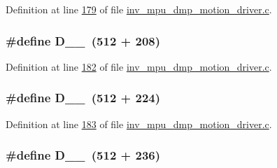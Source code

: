 Definition at line \hyperlink{inv__mpu__dmp__motion__driver_8c_source_l00179}{179} of file \hyperlink{inv__mpu__dmp__motion__driver_8c_source}{inv\+\_\+mpu\+\_\+dmp\+\_\+motion\+\_\+driver.\+c}.

\subsubsection[{\texorpdfstring{D\+\_\+2\+\_\+208}{D_2_208}}]{\setlength{\rightskip}{0pt plus 5cm}\#define D\+\_\+\_~(512 + 208)}\hypertarget{group___d_r_i_v_e_r_s_gae2175af550784283fee34f3e67ba9c35}{}\label{group___d_r_i_v_e_r_s_gae2175af550784283fee34f3e67ba9c35}


Definition at line \hyperlink{inv__mpu__dmp__motion__driver_8c_source_l00182}{182} of file \hyperlink{inv__mpu__dmp__motion__driver_8c_source}{inv\+\_\+mpu\+\_\+dmp\+\_\+motion\+\_\+driver.\+c}.

\subsubsection[{\texorpdfstring{D\+\_\+2\+\_\+224}{D_2_224}}]{\setlength{\rightskip}{0pt plus 5cm}\#define D\+\_\+\_~(512 + 224)}\hypertarget{group___d_r_i_v_e_r_s_ga08f00bcef1e8814906c2354dc8b9e8b8}{}\label{group___d_r_i_v_e_r_s_ga08f00bcef1e8814906c2354dc8b9e8b8}


Definition at line \hyperlink{inv__mpu__dmp__motion__driver_8c_source_l00183}{183} of file \hyperlink{inv__mpu__dmp__motion__driver_8c_source}{inv\+\_\+mpu\+\_\+dmp\+\_\+motion\+\_\+driver.\+c}.

\subsubsection[{\texorpdfstring{D\+\_\+2\+\_\+236}{D_2_236}}]{\setlength{\rightskip}{0pt plus 5cm}\#define D\+\_\+\_~(512 + 236)}\hypertarget{group___d_r_i_v_e_r_s_gafe0c8ed2924052fe714ec9174389bbe0}{}\label{group___d_r_i_v_e_r_s_gafe0c8ed2924052fe714ec9174389bbe0}


